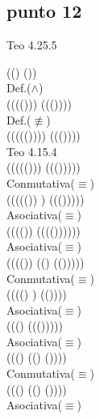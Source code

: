 \documentclass{article}
\begin{document}
\subsection{punto 12}
\begin{logicenv}{Teo 4.25.5}
    \begin{derivation}
            ((\phi \land \psi) \not\equiv (\phi \land \tau))\\
        Def.($\land$)\\
            ((\phi \equiv (\psi \equiv (\phi \lor \psi))) \not\equiv (\phi \equiv (\tau \equiv (\phi \lor \tau))))\\
        Def.($\not\equiv$)\\
            ((\neg (\phi \equiv (\psi \equiv (\phi \lor \psi)))) \equiv (\phi \equiv (\tau \equiv (\phi \lor \tau))))\\
        Teo 4.15.4\\
            (\neg ((\phi \equiv (\psi \equiv (\phi \lor \psi))) \equiv (\phi \equiv (\tau \equiv (\phi \lor \tau)))))\\
        Conmutativa($\equiv$)\\
            (\neg (((\psi \equiv (\phi \lor \psi)) \equiv \phi) \equiv (\phi \equiv (\tau \equiv (\phi \lor \tau)))))\\
        Asociativa($\equiv$)\\
            (\neg ((\psi \equiv (\phi \lor \psi)) \equiv (\phi \equiv (\phi \equiv (\tau \equiv (\phi \lor \tau))))))\\
        Asociativa($\equiv$)\\
            (\neg ((\psi \equiv (\phi \lor \psi)) \equiv ((\phi \equiv \phi) \equiv (\tau \equiv (\phi \lor \tau)))))\\
        Conmutativa($\equiv$)\\
            (\neg (((\phi \lor \psi) \equiv \psi) \equiv (\tau \equiv (\phi \lor \tau))))\\
        Asociativa($\equiv$)\\
            (\neg ((\phi \lor \psi) \equiv (\psi \equiv (\tau \equiv (\phi \lor \tau)))))\\
        Asociativa($\equiv$)\\
            (\neg ((\phi \lor \psi) \equiv ((\psi \equiv \tau) \equiv (\phi \lor \tau))))\\
        Conmutativa($\equiv$)\\
            (\neg ((\phi \lor \psi) \equiv ((\phi \lor \tau) \equiv (\psi \equiv \tau))))\\
        Asociativa($\equiv$)\\

\end{derivation}
\end{logicenv}
\end{document}
